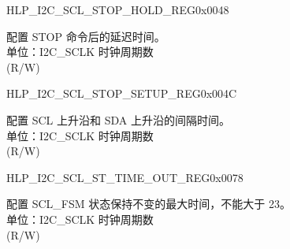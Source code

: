 \begin{register}{H}{LP\_I2C\_SCL\_STOP\_HOLD\_REG}{0x0048}\label{regdesc:LPI2CSCLSTOPHOLDREG}
%
%
\regnewline%
\begin{regdesc}\begin{reglist}
\label{fielddesc:LPI2CSCLSTOPHOLDTIME}\item [LP\_I2C\_SCL\_STOP\_HOLD\_TIME] 配置 STOP 命令后的延迟时间。\\
单位：I2C\_SCLK 时钟周期数 \\ (R/W)
\end{reglist}\end{regdesc}
\end{register}


\begin{register}{H}{LP\_I2C\_SCL\_STOP\_SETUP\_REG}{0x004C}\label{regdesc:LPI2CSCLSTOPSETUPREG}
%
%
\regnewline%
\begin{regdesc}\begin{reglist}
\label{fielddesc:LPI2CSCLSTOPSETUPTIME}\item [LP\_I2C\_SCL\_STOP\_SETUP\_TIME] 配置 SCL 上升沿和 SDA 上升沿的间隔时间。\\
单位：I2C\_SCLK 时钟周期数 \\ (R/W)
\end{reglist}\end{regdesc}
\end{register}


\begin{register}{H}{LP\_I2C\_SCL\_ST\_TIME\_OUT\_REG}{0x0078}\label{regdesc:LPI2CSCLSTTIMEOUTREG}
%
%
\regnewline%
\begin{regdesc}\begin{reglist}
\label{fielddesc:LPI2CSCLSTTOI2C}\item [LP\_I2C\_SCL\_ST\_TO\_I2C] 配置 SCL\_FSM 状态保持不变的最大时间，不能大于 23。\\
单位：I2C\_SCLK 时钟周期数 \\ (R/W)
\end{reglist}\end{regdesc}
\end{register}


